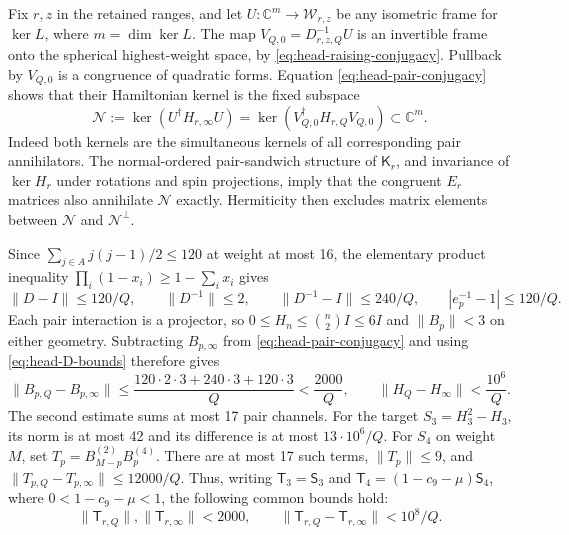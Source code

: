 \documentclass[11pt]{article}
\begin{document}
Fix $r,z$ in the retained ranges, and let
$U:\mathbb C^m\to\mathcal W_{r,z}$ be any isometric frame for $\ker L$,
where $m=\dim\ker L$. The map
$V_{Q,0}=D_{r,z,Q}^{-1}U$ is an invertible frame onto the spherical
highest-weight space, by \eqref{eq:head-raising-conjugacy}. Pullback by
$V_{Q,0}$ is a congruence of quadratic forms. Equation
\eqref{eq:head-pair-conjugacy} shows that their Hamiltonian kernel is the
fixed subspace
\begin{equation}\label{eq:head-fixed-kernel}
 \mathcal N:=\ker(U^\dagger H_{r,\infty}U)
 =\ker(V_{Q,0}^\dagger H_{r,Q}V_{Q,0})\subset\mathbb C^m.
\end{equation}
Indeed both kernels are the simultaneous kernels of all corresponding
pair annihilators. The normal-ordered pair-sandwich structure of
$\mathsf K_r$, and invariance of $\ker H_r$ under rotations and spin
projections, imply that the congruent $E_r$ matrices also annihilate
$\mathcal N$ exactly. Hermiticity then excludes matrix elements between
$\mathcal N$ and $\mathcal N^\perp$.

Since
$\sum_{j\in A}j(j-1)/2\le120$ at weight at most 16, the elementary
product inequality $\prod_i(1-x_i)\ge1-\sum_i x_i$ gives
\begin{equation}\label{eq:head-D-bounds}
 \|D-I\|\le120/Q,\qquad \|D^{-1}\|\le2,\qquad
 \|D^{-1}-I\|\le240/Q,\qquad |e_p^{-1}-1|\le120/Q.
\end{equation}
Each pair interaction is a projector, so
$0\le H_n\le\binom n2I\le6I$ and $\|B_p\|<3$ on either geometry.
Subtracting $B_{p,\infty}$ from \eqref{eq:head-pair-conjugacy} and using
\eqref{eq:head-D-bounds} therefore gives
\begin{equation}\label{eq:head-pair-bound}
 \|B_{p,Q}-B_{p,\infty}\|
 \le\frac{120\cdot2\cdot3+240\cdot3+120\cdot3}{Q}
 <\frac{2000}{Q},\qquad
 \|H_Q-H_\infty\|<\frac{10^6}{Q}.
\end{equation}
The second estimate sums at most 17 pair channels. For the target
$S_3=H_3^2-H_3$, its norm is at most 42 and its difference is at most
$13\cdot10^6/Q$. For $S_4$ on weight $M$, set
$T_p=B_{M-p}^{(2)}B_p^{(4)}$. There are at most 17 such terms,
$\|T_p\|\le9$, and $\|T_{p,Q}-T_{p,\infty}\|\le12000/Q$.
Thus, writing $\mathsf T_3=\mathsf S_3$ and
$\mathsf T_4=(1-c_9-\mu)\mathsf S_4$, where $0<1-c_9-\mu<1$, the
following common bounds hold:
\begin{equation}\label{eq:head-target-bounds}
 \|\mathsf T_{r,Q}\|,\|\mathsf T_{r,\infty}\|<2000,
 \qquad
 \|\mathsf T_{r,Q}-\mathsf T_{r,\infty}\|<10^8/Q.
\end{equation}
\end{document}
